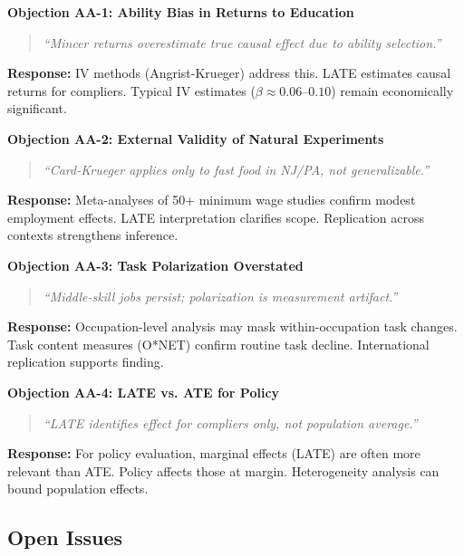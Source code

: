 \begin{tcolorbox}[colback=red!5!white, colframe=red!75!black, title=\textbf{4 Critical Objections and Responses}]

\textbf{Objection AA-1: Ability Bias in Returns to Education}
\begin{quote}
\textit{``Mincer returns overestimate true causal effect due to ability selection.''}
\end{quote}
\textbf{Response:} IV methods (Angrist-Krueger) address this. LATE estimates causal returns for compliers. Typical IV estimates ($\beta \approx 0.06$--$0.10$) remain economically significant.

\textbf{Objection AA-2: External Validity of Natural Experiments}
\begin{quote}
\textit{``Card-Krueger applies only to fast food in NJ/PA, not generalizable.''}
\end{quote}
\textbf{Response:} Meta-analyses of 50+ minimum wage studies confirm modest employment effects. LATE interpretation clarifies scope. Replication across contexts strengthens inference.

\textbf{Objection AA-3: Task Polarization Overstated}
\begin{quote}
\textit{``Middle-skill jobs persist; polarization is measurement artifact.''}
\end{quote}
\textbf{Response:} Occupation-level analysis may mask within-occupation task changes. Task content measures (O*NET) confirm routine task decline. International replication supports finding.

\textbf{Objection AA-4: LATE vs. ATE for Policy}
\begin{quote}
\textit{``LATE identifies effect for compliers only, not population average.''}
\end{quote}
\textbf{Response:} For policy evaluation, marginal effects (LATE) are often more relevant than ATE. Policy affects those at margin. Heterogeneity analysis can bound population effects.
\end{tcolorbox}

\subsection{Open Issues}
\label{sec:aa-open-issues}

